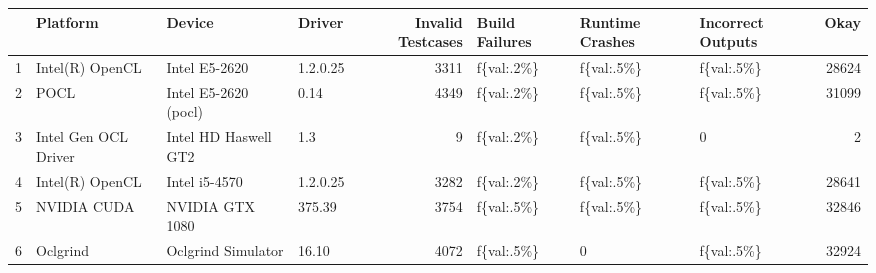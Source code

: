 \begin{tabular}{llllrlllr}
\toprule
{} &              Platform &                Device &    Driver &  Invalid Testcases & Build Failures & Runtime Crashes & Incorrect Outputs &   Okay \\
\midrule
1 &       Intel(R) OpenCL &         Intel E5-2620 &  1.2.0.25 &               3311 &     f\{val:.2\%\} &      f\{val:.5\%\} &        f\{val:.5\%\} &  28624 \\
2 &                  POCL &  Intel E5-2620 (pocl) &      0.14 &               4349 &     f\{val:.2\%\} &      f\{val:.5\%\} &        f\{val:.5\%\} &  31099 \\
3 &  Intel Gen OCL Driver &  Intel HD Haswell GT2 &       1.3 &                  9 &     f\{val:.2\%\} &      f\{val:.5\%\} &                 0 &      2 \\
4 &       Intel(R) OpenCL &         Intel i5-4570 &  1.2.0.25 &               3282 &     f\{val:.2\%\} &      f\{val:.5\%\} &        f\{val:.5\%\} &  28641 \\
5 &           NVIDIA CUDA &       NVIDIA GTX 1080 &    375.39 &               3754 &     f\{val:.5\%\} &      f\{val:.5\%\} &        f\{val:.5\%\} &  32846 \\
6 &              Oclgrind &    Oclgrind Simulator &     16.10 &               4072 &     f\{val:.5\%\} &               0 &        f\{val:.5\%\} &  32924 \\
\bottomrule
\end{tabular}
